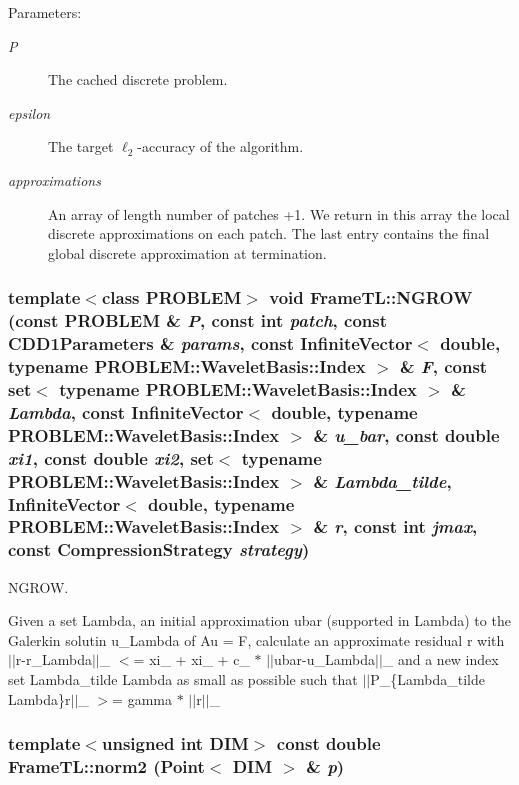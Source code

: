 \begin{Desc}
\item[Parameters:]
\begin{description}
\item[{\em P}]The cached discrete problem. \item[{\em epsilon}]The target $\ell_2$-accuracy of the algorithm. \item[{\em approximations}]An array of length number of patches +1. We return in this array the local discrete approximations on each patch. The last entry contains the final global discrete approximation at termination. \end{description}
\end{Desc}
\hypertarget{namespaceFrameTL_f3d9112d64f468a664317686725617bd}{
\subsubsection[NGROW]{\setlength{\rightskip}{0pt plus 5cm}template$<$class PROBLEM$>$ void FrameTL::NGROW (const PROBLEM \& {\em P}, \/  const int {\em patch}, \/  const CDD1Parameters \& {\em params}, \/  const InfiniteVector$<$ double, typename PROBLEM::WaveletBasis::Index $>$ \& {\em F}, \/  const set$<$ typename PROBLEM::WaveletBasis::Index $>$ \& {\em Lambda}, \/  const InfiniteVector$<$ double, typename PROBLEM::WaveletBasis::Index $>$ \& {\em u\_\-bar}, \/  const double {\em xi1}, \/  const double {\em xi2}, \/  set$<$ typename PROBLEM::WaveletBasis::Index $>$ \& {\em Lambda\_\-tilde}, \/  InfiniteVector$<$ double, typename PROBLEM::WaveletBasis::Index $>$ \& {\em r}, \/  const int {\em jmax}, \/  const CompressionStrategy {\em strategy})}}
\label{namespaceFrameTL_f3d9112d64f468a664317686725617bd}


NGROW. 

Given a set Lambda, an initial approximation ubar (supported in Lambda) to the Galerkin solutin u\_\-Lambda of Au = F, calculate an approximate residual r with $|$$|$r-r\_\-Lambda$|$$|$\_ $<$= xi\_ + xi\_ + c\_ $\ast$ $|$$|$ubar-u\_\-Lambda$|$$|$\_ and a new index set Lambda\_\-tilde Lambda as small as possible such that $|$$|$P\_\-\{Lambda\_\-tilde Lambda\}r$|$$|$\_ $>$= gamma $\ast$ $|$$|$r$|$$|$\_ \hypertarget{namespaceFrameTL_6fd34de92145c0f42b41f9b36a379e9f}{
\subsubsection[norm2]{\setlength{\rightskip}{0pt plus 5cm}template$<$unsigned int DIM$>$ const double FrameTL::norm2 (Point$<$ DIM $>$ \& {\em p})}}
\label{namespaceFrameTL_6fd34de92145c0f42b41f9b36a379e9f}


